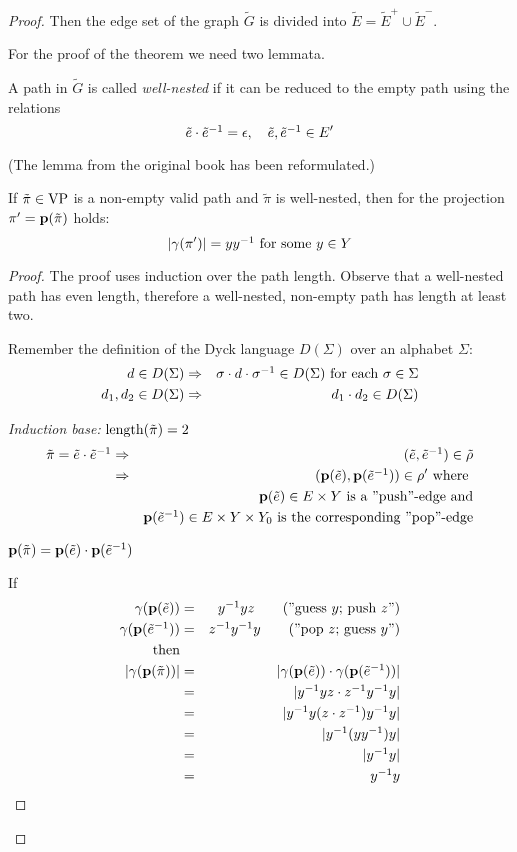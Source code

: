 \begin{proof}
Then the edge set of the graph $\tilde{G}$ is divided into $\tilde{E}
= \tilde{E}^+ \cup \tilde{E}^-$.

For the proof of the theorem we need two lemmata.

A path in $\tilde{G}$ is called {\em well-nested} if it can be reduced to the
empty path using the relations 
\[ \tilde{e} \cdot \mbox{${\tilde{e}}^{-1}$} = \epsilon,\quad \tilde{e}, \mbox{${\tilde{e}}^{-1}$}
\in E'\]

(The lemma from the original book has been reformulated.)

\begin{lemma}
If $\tilde{\pi} \in \mathrm{VP}$ is a non-empty valid path and $\tilde\pi$ is
well-nested, then for the projection $\pi' = \mathbf{p}({\tilde{\pi}})$ holds:
\[ |\gamma(\pi')| = y \mbox{${y}^{-1}$}\text{ for some }y \in Y \]
\end{lemma}

\begin{proof}
The proof uses induction over the path length. Observe that a well-nested
path has even length, therefore a well-nested, non-empty path has length at
least two.

Remember the definition of the Dyck language $D(\Sigma)$ over an alphabet
$\Sigma$:
\begin{eqnarray*}
d \in D(\Sigma) &\Rightarrow& \sigma \cdot d \cdot \mbox{${\sigma}^{-1}$} \in
D(\Sigma)\text{ for each }\sigma \in \Sigma \\
d_1, d_2 \in D(\Sigma) &\Rightarrow& d_1 \cdot d_2 \in D(\Sigma)
\end{eqnarray*}

{\em Induction base:} $\mathrm{length}({\tilde{\pi}})=2$
\begin{eqnarray*}
\tilde{\pi} = \tilde e \cdot \mbox{${\tilde e}^{-1}$} &\Rightarrow& (\tilde e, \mbox{${\tilde
e}^{-1}$}) \in \tilde{\rho} \\
&\Rightarrow& (\mathbf{p}({\tilde e}), \mathbf{p}({\mbox{${\tilde e}^{-1}$}})) \in \rho'\text{ where }\\
&& \mathbf{p}({\tilde e}) \in E \times Y\text{ is a ''push''-edge and} \\
&& \mathbf{p}({\mbox{${\tilde e}^{-1}$}}) \in E \times Y \times Y_0\text{ is the
corresponding ''pop''-edge}
\end{eqnarray*}

$\mathbf{p}({\tilde{\pi}}) = \mathbf{p}({\tilde e}) \cdot \mathbf{p}({\mbox{${\tilde e}^{-1}$}})$

If
\begin{eqnarray*}
\gamma(\mathbf{p}({\tilde e})) &=& \mbox{${y}^{-1}$} y z \qquad\text{(''guess $y$;\ push $z$'')}
\\
\gamma(\mathbf{p}({\mbox{${\tilde e}^{-1}$}})) &=& \mbox{${z}^{-1}$} \mbox{${y}^{-1}$} y \qquad\text{(''pop $z$;\
guess $y$'')} \\
\text{then} \\
|\gamma(\mathbf{p}({\tilde{\pi}}))| &=& |\gamma(\mathbf{p}({\tilde e})) \cdot
\gamma(\mathbf{p}({\mbox{${\tilde e}^{-1}$}}))| \\
&=& |\mbox{${y}^{-1}$} y z \cdot \mbox{${z}^{-1}$} \mbox{${y}^{-1}$} y| \\
&=& |\mbox{${y}^{-1}$} y (z \cdot \mbox{${z}^{-1}$}) \mbox{${y}^{-1}$} y| \\
&=& |\mbox{${y}^{-1}$} (y \mbox{${y}^{-1}$}) y| \\
&=& |\mbox{${y}^{-1}$} y| \\
&=& \mbox{${y}^{-1}$} y
\end{eqnarray*}


\end{proof}
\end{proof}
